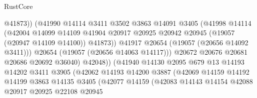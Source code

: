 \begin{lexlean}{RustCore}
\begin{coremodule}
                                      @41873))
                                  (@41990
                                    @14114
                                    @3411
                                    @3502
                                    @3863
                                    @14091
                                    @3405
                                    (@41998
                                      @14114
                                      (@42004
                                        @14099
                                        @14109
                                        @41904
                                        @20917
                                        @20925
                                        @20942
                                        @20945
                                        (@19057 (@20947 @14109 @14100))
                                        @41873))
                                    @41917
                                    @20654
                                    (@19057 (@20656 @14092 @3411)))
                                  @20654
                                  (@19057 (@20656 @14063 @14117)))
                                @20672
                                @20676
                                @20681
                                @20686
                                @20692
                                @36040)
                              @42048))
                          (@41940
                            @14130
                            @2095
                            @679
                            @13
                            @14193
                            @14202
                            @3411
                            @3905
                            (@42062
                              @14193
                              @14200
                              @3887
                              (@42069
                                @14159
                                @14192
                                @14199
                                @3863
                                @14135
                                @3405
                                (@42077
                                  @14159
                                  (@42083
                                    @14143
                                    @14154
                                    @42088
                                    @20917
                                    @20925
                                    @22108
                                    @20945

\end{coremodule}
\end{lexlean}
